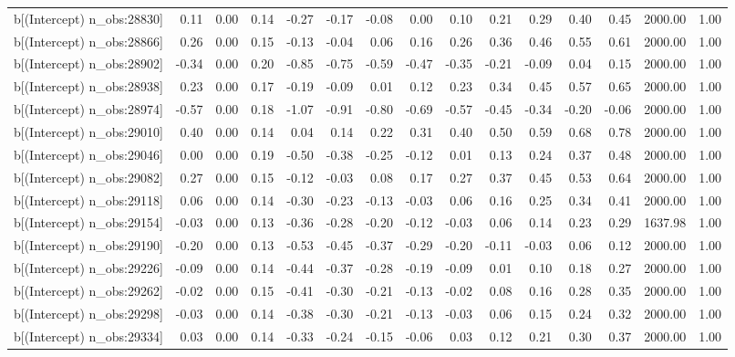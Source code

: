 \begin{table}[ht]
\begin{tabular}{rrrrrrrrrrrrrrr}
  b[(Intercept) n\_obs:28830] & 0.11 & 0.00 & 0.14 & -0.27 & -0.17 & -0.08 & 0.00 & 0.10 & 0.21 & 0.29 & 0.40 & 0.45 & 2000.00 & 1.00 \\ 
  b[(Intercept) n\_obs:28866] & 0.26 & 0.00 & 0.15 & -0.13 & -0.04 & 0.06 & 0.16 & 0.26 & 0.36 & 0.46 & 0.55 & 0.61 & 2000.00 & 1.00 \\ 
  b[(Intercept) n\_obs:28902] & -0.34 & 0.00 & 0.20 & -0.85 & -0.75 & -0.59 & -0.47 & -0.35 & -0.21 & -0.09 & 0.04 & 0.15 & 2000.00 & 1.00 \\ 
  b[(Intercept) n\_obs:28938] & 0.23 & 0.00 & 0.17 & -0.19 & -0.09 & 0.01 & 0.12 & 0.23 & 0.34 & 0.45 & 0.57 & 0.65 & 2000.00 & 1.00 \\ 
  b[(Intercept) n\_obs:28974] & -0.57 & 0.00 & 0.18 & -1.07 & -0.91 & -0.80 & -0.69 & -0.57 & -0.45 & -0.34 & -0.20 & -0.06 & 2000.00 & 1.00 \\ 
  b[(Intercept) n\_obs:29010] & 0.40 & 0.00 & 0.14 & 0.04 & 0.14 & 0.22 & 0.31 & 0.40 & 0.50 & 0.59 & 0.68 & 0.78 & 2000.00 & 1.00 \\ 
  b[(Intercept) n\_obs:29046] & 0.00 & 0.00 & 0.19 & -0.50 & -0.38 & -0.25 & -0.12 & 0.01 & 0.13 & 0.24 & 0.37 & 0.48 & 2000.00 & 1.00 \\ 
  b[(Intercept) n\_obs:29082] & 0.27 & 0.00 & 0.15 & -0.12 & -0.03 & 0.08 & 0.17 & 0.27 & 0.37 & 0.45 & 0.53 & 0.64 & 2000.00 & 1.00 \\ 
  b[(Intercept) n\_obs:29118] & 0.06 & 0.00 & 0.14 & -0.30 & -0.23 & -0.13 & -0.03 & 0.06 & 0.16 & 0.25 & 0.34 & 0.41 & 2000.00 & 1.00 \\ 
  b[(Intercept) n\_obs:29154] & -0.03 & 0.00 & 0.13 & -0.36 & -0.28 & -0.20 & -0.12 & -0.03 & 0.06 & 0.14 & 0.23 & 0.29 & 1637.98 & 1.00 \\ 
  b[(Intercept) n\_obs:29190] & -0.20 & 0.00 & 0.13 & -0.53 & -0.45 & -0.37 & -0.29 & -0.20 & -0.11 & -0.03 & 0.06 & 0.12 & 2000.00 & 1.00 \\ 
  b[(Intercept) n\_obs:29226] & -0.09 & 0.00 & 0.14 & -0.44 & -0.37 & -0.28 & -0.19 & -0.09 & 0.01 & 0.10 & 0.18 & 0.27 & 2000.00 & 1.00 \\ 
  b[(Intercept) n\_obs:29262] & -0.02 & 0.00 & 0.15 & -0.41 & -0.30 & -0.21 & -0.13 & -0.02 & 0.08 & 0.16 & 0.28 & 0.35 & 2000.00 & 1.00 \\ 
  b[(Intercept) n\_obs:29298] & -0.03 & 0.00 & 0.14 & -0.38 & -0.30 & -0.21 & -0.13 & -0.03 & 0.06 & 0.15 & 0.24 & 0.32 & 2000.00 & 1.00 \\ 
  b[(Intercept) n\_obs:29334] & 0.03 & 0.00 & 0.14 & -0.33 & -0.24 & -0.15 & -0.06 & 0.03 & 0.12 & 0.21 & 0.30 & 0.37 & 2000.00 & 1.00 \\ 

\end{tabular}
\end{table}
